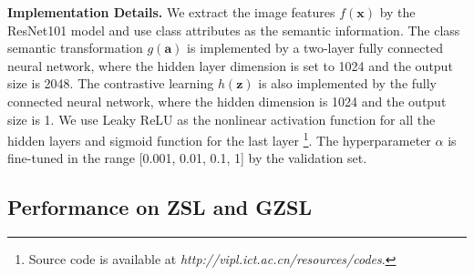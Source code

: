 \documentclass[10pt,twocolumn,letterpaper]{article}
\begin{document}
\textbf{Implementation Details.} We extract the image features $f(\bm{x})$ by the ResNet101 model \cite{Kaiming2016} and use class attributes as the semantic information. The class semantic transformation $g(\bm{a})$ is implemented by a two-layer fully connected neural network, where the hidden layer dimension is set to 1024 and the output size is 2048. The contrastive learning $h(\bm{z})$ is also implemented by the fully connected neural network, where the hidden dimension is 1024 and the output size is 1. We use Leaky ReLU as the nonlinear activation function for all the hidden layers and sigmoid function for the last layer \footnote{Source code is available at \emph{http://vipl.ict.ac.cn/resources/codes}.}. The hyperparameter $\alpha$ is fine-tuned in the range [0.001, 0.01, 0.1, 1] by the validation set.

\subsection{Performance on ZSL and GZSL}
\end{document}
